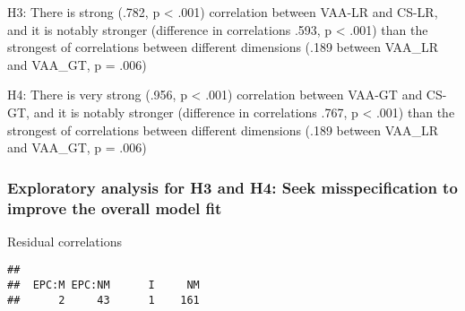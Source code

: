 \documentclass[
]{article}
\newenvironment{Shaded}{\begin{snugshade}}{\end{snugshade}}
\newcommand{\CommentTok}[1]{\textcolor[rgb]{0.56,0.35,0.01}{\textit{#1}}}
\newcommand{\DataTypeTok}[1]{\textcolor[rgb]{0.13,0.29,0.53}{#1}}
\newcommand{\DecValTok}[1]{\textcolor[rgb]{0.00,0.00,0.81}{#1}}
\newcommand{\KeywordTok}[1]{\textcolor[rgb]{0.13,0.29,0.53}{\textbf{#1}}}
\newcommand{\NormalTok}[1]{#1}
\newcommand{\OperatorTok}[1]{\textcolor[rgb]{0.81,0.36,0.00}{\textbf{#1}}}
\newcommand{\StringTok}[1]{\textcolor[rgb]{0.31,0.60,0.02}{#1}}
\begin{document}
H3: There is strong (.782, p \textless{} .001) correlation between
VAA-LR and CS-LR, and it is notably stronger (difference in correlations
.593, p \textless{} .001) than the strongest of correlations between
different dimensions (.189 between VAA\_LR and VAA\_GT, p = .006)

H4: There is very strong (.956, p \textless{} .001) correlation between
VAA-GT and CS-GT, and it is notably stronger (difference in correlations
.767, p \textless{} .001) than the strongest of correlations between
different dimensions (.189 between VAA\_LR and VAA\_GT, p = .006)

\newpage

\hypertarget{exploratory-analysis-for-h3-and-h4-seek-misspecification-to-improve-the-overall-model-fit}{%
\subsubsection{Exploratory analysis for H3 and H4: Seek misspecification
to improve the overall model
fit}\label{exploratory-analysis-for-h3-and-h4-seek-misspecification-to-improve-the-overall-model-fit}}

Residual correlations

\begin{Shaded}
\end{Shaded}

\begin{verbatim}
## 
##  EPC:M EPC:NM      I     NM 
##      2     43      1    161
\end{verbatim}
\end{document}
